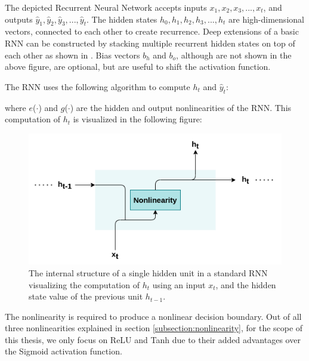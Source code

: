 The depicted Recurrent Neural Network accepts inputs $x_1, x_2, x_3, ..., x_t$, and outputs $\hat{y}_1, \hat{y}_2, \hat{y}_3, ..., \hat{y}_t$. The hidden states $h_0, h_1, h_2, h_3, ..., h_t$ are high-dimensional vectors, connected to each other to create recurrence. Deep extensions of a basic RNN can be constructed by stacking multiple recurrent hidden states on top of each other as shown in \cite{deeprnn}. Bias vectors $b_h$ and $b_o$, although are not shown in the above figure, are optional, but are useful to shift the activation function.

The RNN uses the following algorithm to compute $h_t$ and $\hat{y}_t$:

\begin{algorithm}
  \caption[Standard RNN algorithm]%
  {A standard RNN algorithm}
  \label{alg:rnn}
\end{algorithm}

where $e$($\cdot$) and $g$($\cdot$) are the hidden and output nonlinearities of the RNN. This computation of $h_t$ is visualized in the following figure:

\begin{figure}[h]
	\centering
	\includegraphics[width=0.6\linewidth]{images/background/rnn_unit.png}
	\caption[Internal structure of a single hidden unit in a standard RNN]%
	{The internal structure of a single hidden unit in a standard RNN visualizing the computation of $h_t$ using an input $x_t$, and the hidden state value of the previous unit $h_{t-1}$.}
	\label{fig:rnn_unit}
\end{figure}

The nonlinearity is required to produce a nonlinear decision boundary. Out of all three nonlinearities explained in section \ref{subsection:nonlinearity}, for the scope of this thesis, we only focus on ReLU and Tanh due to their added advantages over the Sigmoid activation function.

